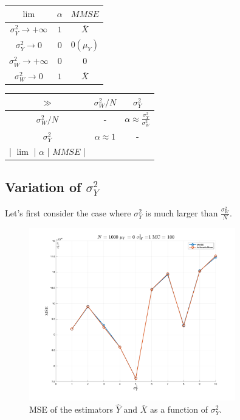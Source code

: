\begin{table}[H]
    \centering
    \begin{tabular}{|c|c|c|}
        \hline
        $\lim$                 & $\alpha$ & $MMSE$      \\
        \hline
        $\sigma^2_Y\to+\infty$ & $1$      & $\bar X$    \\
        $\sigma^2_Y\to 0$      & $0$      & $0 (\mu_Y)$ \\
        $\sigma^2_W\to+\infty$ & $0$      & $0$         \\
        $\sigma^2_W\to 0$      & $1$      & $\bar X$    \\
        \hline
    \end{tabular}
    \quad
    \begin{tabular}{|c|c|c|}
        \hline
        $\gg$          & $\sigma^2_W/N$     & $\sigma^2_Y$                                   \\
        \hline
        $\sigma^2_W/N$ & -                  & $\alpha \approx \frac{\sigma^2_Y}{\sigma^2_W}$ \\
        $\sigma^2_Y$   & $\alpha \approx 1$ & -                                              \\| $\lim$ | $\alpha$ | $MMSE$ |
    \end{tabular}
\end{table}

\subsection*{Variation of $\sigma^2_Y$}
Let's first consider the case where $\sigma^2_Y$ is much larger than $\frac {\sigma^2_W}N$.

\begin{figure}[H]
    \centering
    \includegraphics[width=0.8\textwidth]{./figures/appendix_a/figure_6.png}
    \caption{MSE of the estimators $\hat Y$ and $\bar X$ as a function of $\sigma^2_Y$.}
    \label{fig:mmse_sigma_y}
\end{figure}

